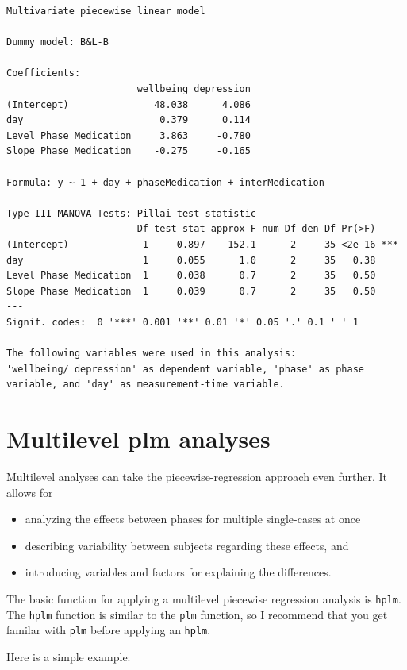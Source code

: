 \documentclass[
]{book}
\providecommand{\tightlist}{%
  \setlength{\itemsep}{0pt}\setlength{\parskip}{0pt}}
\begin{document}
\begin{verbatim}
Multivariate piecewise linear model

Dummy model: B&L-B 

Coefficients: 
                       wellbeing depression
(Intercept)               48.038      4.086
day                        0.379      0.114
Level Phase Medication     3.863     -0.780
Slope Phase Medication    -0.275     -0.165

Formula: y ~ 1 + day + phaseMedication + interMedication

Type III MANOVA Tests: Pillai test statistic
                       Df test stat approx F num Df den Df Pr(>F)    
(Intercept)             1     0.897    152.1      2     35 <2e-16 ***
day                     1     0.055      1.0      2     35   0.38    
Level Phase Medication  1     0.038      0.7      2     35   0.50    
Slope Phase Medication  1     0.039      0.7      2     35   0.50    
---
Signif. codes:  0 '***' 0.001 '**' 0.01 '*' 0.05 '.' 0.1 ' ' 1

The following variables were used in this analysis:
'wellbeing/ depression' as dependent variable, 'phase' as phase variable, and 'day' as measurement-time variable.
\end{verbatim}

\hypertarget{multilevel-plm-analyses}{%
\section{Multilevel plm analyses}\label{multilevel-plm-analyses}}

Multilevel analyses can take the piecewise-regression approach even further. It allows for

\begin{itemize}
\tightlist
\item
  analyzing the effects between phases for multiple single-cases at once
\item
  describing variability between subjects regarding these effects, and
\item
  introducing variables and factors for explaining the differences.
\end{itemize}

The basic function for applying a multilevel piecewise regression analysis is \texttt{hplm}. The \texttt{hplm} function is similar to the \texttt{plm} function, so I recommend that you get familar with \texttt{plm} before applying an \texttt{hplm}.

Here is a simple example:
\end{document}
